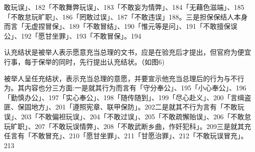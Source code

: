 \vfill
\begin{BookNotes}
\end{BookNotes}


\noindent 敢玩误」、182「不敢舞弊玩误」、183「不敢妄为情弊」、184「无藉色滋端」、185「不敢怠玩旷职」、186「罔敢过误」、187「不敢违误」188。三是担保保结人本身而言「无虚捏冒保」、189「不敢冒结」、190「惟元等是问」、191「不敢擅保误公」、192「愿甘坐罪」、193「不敢冒保」。194

\vfill
\begin{BookNotes}
\end{BookNotes}



\begin{BookQuote}
认充结状是被举人表示愿意充当总理的文书，应是在验充后才提出，但官府为便宜行事，每于保举的同时，先行提出认充结状。（如图6)
\end{BookQuote}

被举人呈任充结状，表示充当总理的意愿，并要宣示他充当总理后的行为与不行为。其内容也分三方面:一是就其行为而言有「守分奉公」、195「小心奉公」、196「勤慎办公」、197「实心奉公」、198「随传随到」、199「尽心赴义」、200「言缉盗匪、保固地方」、201「遵照宪章、联甲保防」。202二是就其不行为言有「不敢玩误」、203「不敢偏袒玩误」、204「不敢过误」、205「不敢疏懈贻误」、206「不敢怠玩旷职」、207「不敢玩误情弊」、208「不敢武断乡曲，作奸犯科」。209三是就其充任言有「不敢冒充」、210「愿甘坐罪」、211「甘愿治罪」、212「不敢玩误冒充」。213


